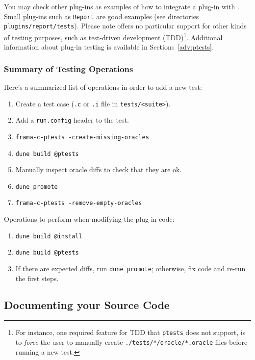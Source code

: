 You may check other \framac plug-ins as examples of how to integrate a
plug-in with \ptests. Small plug-ins such as \texttt{Report} are good examples
(see directories \texttt{plugins/report/tests}).
Please note \framac offers no particular support for other kinds of testing
purposes, such as test-driven development (TDD)\footnote{For instance, one
required feature for TDD that \texttt{ptests} does not support, is to
{\em force} the user to manually create \texttt{./tests/*/oracle/*.oracle}
files before running a new test.}.
Additional information about plug-in testing is available in
Sections~\ref{adv:ptests}.

\subsubsection{Summary of Testing Operations}

Here's a summarized list of operations in order to add a new test:

\begin{enumerate}
\item Create a test case (\texttt{.c} or \texttt{.i} file in
  \texttt{tests/<suite>}).
\item Add a \texttt{run.config} header to the test.
\item \verb|frama-c-ptests -create-missing-oracles|
\item \verb|dune build @ptests|
\item Manually inspect oracle diffs to check that they are ok.
\item \verb|dune promote|
\item \verb|frama-c-ptests -remove-empty-oracles|
\end{enumerate}

Operations to perform when modifying the plug-in code:

\begin{enumerate}
\item \verb|dune build @install|
\item \verb|dune build @ptests|
\item If there are expected diffs, run \verb|dune promote|;
  otherwise, fix code and re-run the first steps.
\end{enumerate}

\subsection{Documenting your Source Code}
\label{tut2:doc}

